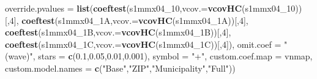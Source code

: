 \documentclass[
]{article}
\newenvironment{Shaded}{\begin{snugshade}}{\end{snugshade}}
\newcommand{\DataTypeTok}[1]{\textcolor[rgb]{0.13,0.29,0.53}{#1}}
\newcommand{\DecValTok}[1]{\textcolor[rgb]{0.00,0.00,0.81}{#1}}
\newcommand{\FloatTok}[1]{\textcolor[rgb]{0.00,0.00,0.81}{#1}}
\newcommand{\KeywordTok}[1]{\textcolor[rgb]{0.13,0.29,0.53}{\textbf{#1}}}
\newcommand{\NormalTok}[1]{#1}
\newcommand{\StringTok}[1]{\textcolor[rgb]{0.31,0.60,0.02}{#1}}
\begin{document}
\begin{Shaded}
\begin{Highlighting}[]
          \DataTypeTok{override.pvalues =} \KeywordTok{list}\NormalTok{(}\KeywordTok{coeftest}\NormalTok{(s1mmx04_}\DecValTok{10}\NormalTok{,}\DataTypeTok{vcov.=}\KeywordTok{vcovHC}\NormalTok{(s1mmx04_}\DecValTok{10}\NormalTok{))[,}\DecValTok{4}\NormalTok{],}
                                  \KeywordTok{coeftest}\NormalTok{(s1mmx04_1A,}\DataTypeTok{vcov.=}\KeywordTok{vcovHC}\NormalTok{(s1mmx04_1A))[,}\DecValTok{4}\NormalTok{],}
                                  \KeywordTok{coeftest}\NormalTok{(s1mmx04_1B,}\DataTypeTok{vcov.=}\KeywordTok{vcovHC}\NormalTok{(s1mmx04_1B))[,}\DecValTok{4}\NormalTok{],}
                                  \KeywordTok{coeftest}\NormalTok{(s1mmx04_1C,}\DataTypeTok{vcov.=}\KeywordTok{vcovHC}\NormalTok{(s1mmx04_1C))[,}\DecValTok{4}\NormalTok{]),}
          \DataTypeTok{omit.coef =} \StringTok{"(wave)"}\NormalTok{, }\DataTypeTok{stars =} \KeywordTok{c}\NormalTok{(}\FloatTok{0.1}\NormalTok{,}\FloatTok{0.05}\NormalTok{,}\FloatTok{0.01}\NormalTok{,}\FloatTok{0.001}\NormalTok{), }\DataTypeTok{symbol =} \StringTok{"+"}\NormalTok{,}
          \DataTypeTok{custom.coef.map =}\NormalTok{ vnmap, }
          \DataTypeTok{custom.model.names =} \KeywordTok{c}\NormalTok{(}\StringTok{"Base"}\NormalTok{,}\StringTok{"ZIP"}\NormalTok{,}\StringTok{"Municipality"}\NormalTok{,}\StringTok{"Full"}\NormalTok{))}
\end{Highlighting}
\end{Shaded}
\end{document}
